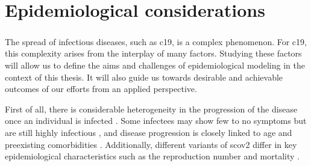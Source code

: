 \glsresetall
\chapter{Epidemiological considerations}
\label{chap:epidemiological_considerations}
\newpage
\begin{tcolorbox}[title={Contributions of this chapter}]
    
    \paragraph{}

    \paragraph{}

    \paragraph{}

    \paragraph{}

\end{tcolorbox}
\newpage

The spread of infectious diseases, such as \acrshort{c19}, is a complex phenomenon. For \acrshort{c19}, this complexity arises from the interplay of many factors. Studying these factors will allow us to define the aims and challenges of epidemiological modeling in the context of this thesis. It will also guide us towards desirable and achievable outcomes of our efforts from an applied perspective.

First of all, there is considerable heterogeneity in the progression of the disease once an individual is infected \citep{Salzberger2021Epidemiology}. Some infectees may show few to no symptoms but are still highly infectious \citep{Byambasuren2020Estimating}, and disease progression is closely linked to age and preexisting comorbidities \citep{Biswas2020Association}. Additionally, different variants of \acrshort{scov2} differ in key epidemiological characteristics such as the reproduction number \citep{Du2022Reproduction} and mortality \citep{Hughes2023Effect}. 

